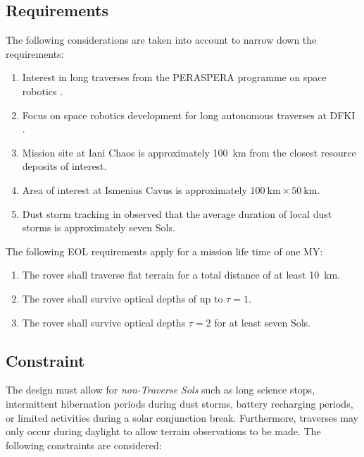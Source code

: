 \subsection{Requirements}
\label{sec:sec:Design:RequirementsAndDesignDrivers:Requirements}
The following considerations are taken into account to narrow down the requirements:

\begin{enumerate}[label=\textcolor{BulletBlue}{(\alph*)}]
    \item Interest in long traverses from the PERASPERA programme on space robotics .
    \item Focus on space robotics development for long autonomous traverses at \ac{DFKI}  .
    \item Mission site at Iani Chaos is approximately \SI{100}{\kilo\meter} from the closest resource deposits of interest.
    \item Area of interest at Ismenius Cavus is approximately $\SI{100}{\kilo\meter} \times \SI{50}{\kilo\meter}$.
    \item Dust storm tracking in  observed that the average duration of local dust storms is approximately seven Sols.
\end{enumerate}

The following \ac{EOL} requirements apply for a mission life time of one \ac{MY}:

\resetLeadingZeroCounter
\begin{enumerate}[leftmargin=1.30cm, label=\zeroLeadCounter{R}]
    \item \label{itm:req:total_distance_flat_terrain} The rover shall traverse flat terrain for a total distance of at least \SI{10}{\kilo\meter}.
    \item \label{itm:req:survive_tau1} The rover shall survive optical depths of up to $\tau = 1$.
    \item \label{itm:req:survice_tau2} The rover shall survive optical depths $\tau = 2$ for at least seven Sols.
\end{enumerate}

\subsection{Constraint}
\label{sec:Design:RequirementsAndDesignDrivers:Constraints}
The design must allow for \textit{non-Traverse Sols} such as long science stops, intermittent hibernation periods during dust storms, battery recharging periods, or limited activities during a solar conjunction break. Furthermore, traverses may only occur during daylight to allow terrain observations to be made. The following constraints are considered:

